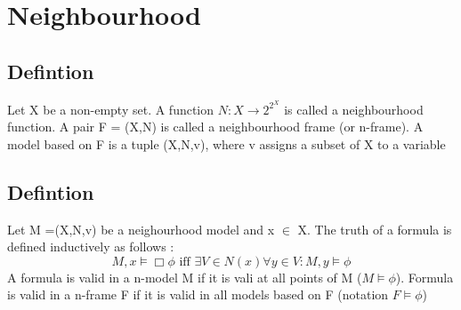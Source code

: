 \documentclass[12pt, a4paper]{scrreprt}
\begin{document}
\chapter{Neighbourhood} 

\section{Defintion} 
Let X be a non-empty set. A function  $N : X \rightarrow 2^{2^X}$ is called a neighbourhood function. A pair 
F = (X,N) is called a neighbourhood frame (or n-frame). A model based on F is a tuple (X,N,v), where v assigns a subset of X to a variable

\section{Defintion}

Let M =(X,N,v) be a neighourhood model and x $\in$ X. The truth of a formula is defined inductively as follows :
$$M,x \models \Box \phi \mbox{ iff } \exists V \in N(x) \forall y \in V : M,y \models \phi$$ 
A formula is valid in a n-model M if it is vali at all points of M ($M \models \phi$). Formula is valid in a n-frame F if it is valid in
all models based on F (notation $F \models \phi$)
\end{document}
